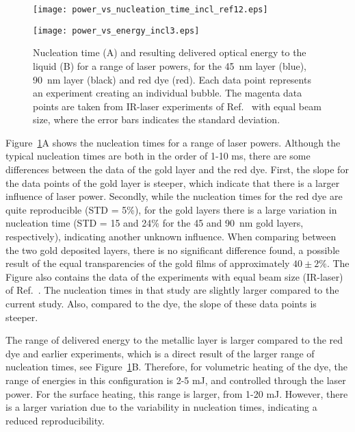\documentclass[11pt]{article}
\begin{document}
	\begin{figure}[t!]
		
		\begin{minipage}[t]{0.5\linewidth}
			\centering
			\texttt{[image: power\_vs\_nucleation\_time\_incl\_ref12.eps]}
		\end{minipage}
		\begin{minipage}[t]{0.5\linewidth}
			\centering
			\texttt{[image: power\_vs\_energy\_incl3.eps]}
		\end{minipage}
		\caption{Nucleation time (A) and resulting delivered optical energy to the liquid (B) for a range of laser powers, for the 45~nm layer (blue), 90~nm layer (black) and red dye (red). Each data point represents an experiment creating an individual bubble. The magenta data points are taken from IR-laser experiments of Ref.~\cite{Schoppink2024} with equal beam size, where the error bars indicates the standard deviation.}
		\label{C4: fig: power vs nucl time and energy}
	\end{figure}


Figure~\ref{C4: fig: power vs nucl time and energy}A shows the nucleation times for a range of laser powers. Although the typical nucleation times are both in the order of 1-10 ms, there are some differences between the data of the gold layer and the red dye. First, the slope for the data points of the gold layer is steeper, which indicate that there is a larger influence of laser power. Secondly, while the nucleation times for the red dye are quite reproducible (STD = 5\%), for the gold layers there is a large variation in nucleation time (STD = 15 and 24\% for the 45 and 90~nm gold layers, respectively), indicating another unknown influence. When comparing between the two gold deposited layers, there is no significant difference found, a possible result of the equal transparencies of the gold films of approximately $40\pm2\%$. The Figure also contains the data of the experiments with equal beam size (IR-laser) of Ref.~\cite{Schoppink2024}. The nucleation times in that study are slightly larger compared to the current study. Also, compared to the dye, the slope of these data points is steeper.

The range of delivered energy to the metallic layer is larger compared to the red dye and earlier experiments, which is a direct result of the larger range of nucleation times, see Figure~\ref{C4: fig: power vs nucl time and energy}B. Therefore, for volumetric heating of the dye, the range of energies in this configuration is 2-5 mJ, and controlled through the laser power. For the surface heating, this range is larger, from 1-20 mJ. However, there is a larger variation due to the variability in nucleation times, indicating a reduced reproducibility. 
\end{document}
